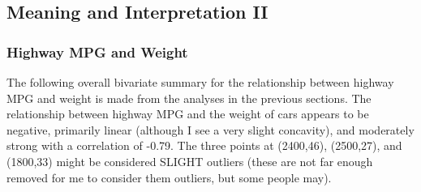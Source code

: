 \documentclass[10pt,openany]{book}\usepackage[]{graphicx}\usepackage[]{color}
\begin{document}
\subsection{Meaning and Interpretation II}
\subsubsection{Highway MPG and Weight}
The following overall bivariate summary for the relationship between highway MPG and weight is made from the analyses in the previous sections.  The relationship between highway MPG and the weight of cars  appears to be negative, primarily linear (although I see a very slight concavity), and moderately strong with a correlation of -0.79.  The three points at (2400,46), (2500,27), and (1800,33) might be considered SLIGHT outliers (these are not far enough removed for me to consider them outliers, but some people may).
\end{document}
